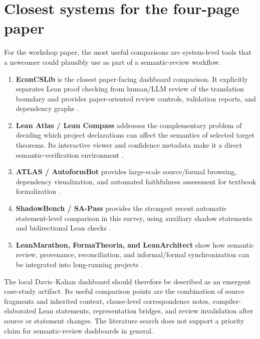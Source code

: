 \documentclass[11pt]{article}
\begin{document}
\section{Closest systems for the four-page paper}

For the workshop paper, the most useful comparisons are system-level tools that
a newcomer could plausibly use as part of a semantic-review workflow.

\begin{enumerate}
  \item \textbf{EconCSLib} is the closest paper-facing dashboard comparison.  It
  explicitly separates Lean proof checking from human/LLM review of the
  translation boundary and provides paper-oriented review controls, validation
  reports, and dependency graphs \citep{garg2026econcs}.

  \item \textbf{Lean Atlas / Lean Compass} addresses the complementary problem
  of deciding which project declarations can affect the semantics of selected
  target theorems.  Its interactive viewer and confidence metadata make it a
  direct semantic-verification environment \citep{yanahama2026leanatlas}.

  \item \textbf{ATLAS / AutoformBot} provides large-scale source/formal browsing,
  dependency visualization, and automated faithfulness assessment for textbook
  formalization \citep{rammal2026scale}.

  \item \textbf{ShadowBench / SA-Pass} provides the strongest recent automatic
  statement-level comparison in this survey, using auxiliary shadow statements
  and bidirectional Lean checks \citep{han2026shadowbench}.

  \item \textbf{LeanMarathon, FormaTheoria, and LeanArchitect} show how semantic
  review, provenance, reconciliation, and informal/formal synchronization can be
  integrated into long-running projects
  \citep{zhang2026leanmarathon,nie2026formatheoria,zhu2026leanarchitect}.
\end{enumerate}

The local Davis--Kahan dashboard should therefore be described as an emergent
case-study artifact.  Its useful comparison points are the combination of source
fragments and inherited context, clause-level correspondence notes,
compiler-elaborated Lean statements, representation bridges, and review
invalidation after source or statement changes.  The literature search does not
support a priority claim for semantic-review dashboards in general.
\end{document}
